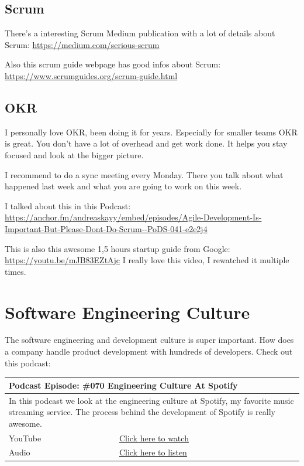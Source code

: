 \documentclass[12pt, numbers=noenddot]{scrreprt} %
\begin{document}
\subsection{Scrum}

There's a interesting Scrum Medium publication with a lot of details about Scrum: \url{https://medium.com/serious-scrum}

Also this scrum guide webpage has good infos about Scrum: \url{https://www.scrumguides.org/scrum-guide.html}

\subsection{OKR}

I personally love OKR, been doing it for years. Especially for smaller teams OKR is great. You don't have a lot of overhead and get work done.
It helps you stay focused and look at the bigger picture.

I recommend to do a sync meeting every Monday. There you talk about what happened last week and what you are going to work on this week.

I talked about this in this Podcast: \url{https://anchor.fm/andreaskayy/embed/episodes/Agile-Development-Is-Important-But-Please-Dont-Do-Scrum--PoDS-041-e2e2j4}

This is also this awesome 1,5 hours startup guide from Google: \url{https://youtu.be/mJB83EZtAjc} I really love this video, I rewatched it multiple times.

\section{Software Engineering Culture}

The software engineering and development culture is super important. How does a company handle product development with hundreds of developers. Check out this podcast:

\begin{table}[h]
\begin{tabular}{ll}
\hline
\multicolumn{2}{l}{\textbf{Podcast Episode:} \#070 Engineering Culture At Spotify} \\ \hline
\multicolumn{2}{p{15cm}}{In this podcast we look at the engineering culture at Spotify, my favorite music streaming service.
The process behind the development of Spotify is really awesome.}         \\ \hline
\multicolumn{1}{l|}{YouTube}   & \href{https://youtu.be/1asVrsUDbp0}{Click here to watch}   \\
\multicolumn{1}{l|}{Audio}     & \href{https://anchor.fm/andreaskayy/episodes/070-The-Engineering-Culture-At-Spotify-e45ipa}{Click here to listen}   \\ \hline
\end{tabular}
\end{table}
\end{document}
